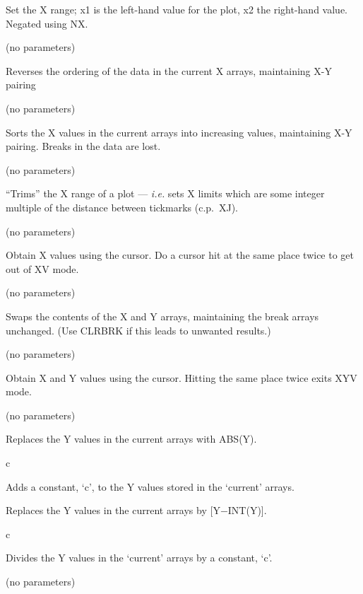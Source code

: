 \begin {description}
Set the X range; x1 is the left-hand value for the plot, x2 the
right-hand value. Negated using NX.

\item [XREV] (no parameters)

Reverses the ordering of the data in the current X arrays, maintaining
X-Y pairing

\item [XSORT] (no parameters)

Sorts the X values in the current arrays into increasing values,
maintaining X-Y pairing. Breaks in the data are lost.

\item [XT] (no parameters)

``Trims'' the X range of a plot --- {\em i.e.} sets X limits which are
some integer multiple of the distance between tickmarks (c.p.\ XJ).

\item [XV] (no parameters)

Obtain X values using the cursor. Do a cursor hit at the same place
twice to get out of XV mode.

\item [XYSWAP] (no parameters)

Swaps the contents of the X and Y arrays, maintaining the break arrays
unchanged. (Use CLRBRK if this leads to unwanted results.)

\item [XYV] (no parameters)

Obtain X and Y values using the cursor. Hitting the same place twice
exits XYV mode.

\item [YABS] (no parameters)

Replaces the Y values in the current arrays with ABS(Y).

\item [YADD] c

Adds a constant, `c', to the Y values stored in the `current' arrays.

\item [YDEC]

Replaces the Y values in the current arrays by [Y$-$INT(Y)].

\item [YDIV] c

Divides the Y values in the `current' arrays by a constant, `c'.

\item [YINT] (no parameters)


\end{description}
